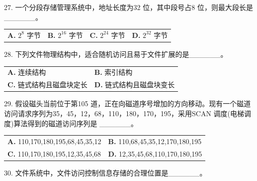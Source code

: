 \documentclass[UTF8,11pt]{ctexart}
\begin{document}
27. 一个分段存储管理系统中，地址长度为32 位，其中段号占8 位，则最大段长是\_\_\_\_\_\_。


\begin{center}\begin{tabular}{>{\raggedright\arraybackslash}p{\dimexpr(\linewidth-8\tabcolsep)/4\relax}>{\raggedright\arraybackslash}p{\dimexpr(\linewidth-8\tabcolsep)/4\relax}>{\raggedright\arraybackslash}p{\dimexpr(\linewidth-8\tabcolsep)/4\relax}>{\raggedright\arraybackslash}p{\dimexpr(\linewidth-8\tabcolsep)/4\relax}}
\textbf{A.} \(\displaystyle 2^8\) 字节 & \textbf{B.} \(\displaystyle 2^{16}\) 字节 & \textbf{C.} \(\displaystyle 2^{24}\) 字节 & \textbf{D.} \(\displaystyle 2^{32}\) 字节\\[.35em]\end{tabular}\end{center}

28. 下列文件物理结构中，适合随机访问且易于文件扩展的是\_\_\_\_\_\_。


\begin{center}\begin{tabular}{>{\raggedright\arraybackslash}p{\dimexpr(\linewidth-4\tabcolsep)/2\relax}>{\raggedright\arraybackslash}p{\dimexpr(\linewidth-4\tabcolsep)/2\relax}}
\textbf{A.} 连续结构 & \textbf{B.} 索引结构\\[.35em]
\textbf{C.} 链式结构且磁盘块定长 & \textbf{D.} 链式结构且磁盘块变长\\[.35em]\end{tabular}\end{center}

29. 假设磁头当前位于第105 道，正在向磁道序号增加的方向移动。现有一个磁道访问请求序列为35，45，12，68，110，180，170，195，采用SCAN 调度(电梯调度)算法得到的磁道访问序列是 \_\_\_\_\_\_。


\begin{center}\begin{tabular}{>{\raggedright\arraybackslash}p{\dimexpr(\linewidth-4\tabcolsep)/2\relax}>{\raggedright\arraybackslash}p{\dimexpr(\linewidth-4\tabcolsep)/2\relax}}
\textbf{A.} 110,170,180,195,68,45,35,12 & \textbf{B.} 110,68,45,35,12,170,180,195\\[.35em]
\textbf{C.} 110,170,180,195,12,35,45,68 & \textbf{D.} 12,35,45,68,110,170,180,195\\[.35em]\end{tabular}\end{center}

30. 文件系统中，文件访问控制信息存储的合理位置是\_\_\_\_\_\_。
\end{document}
